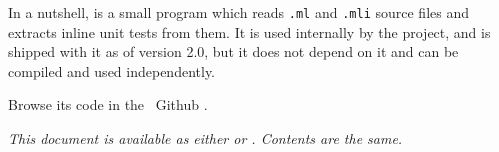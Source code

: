 
In a nutshell, \qtest{} is a small program which reads \texttt{.ml} and \texttt{.mli} source files and
extracts inline \ounit{} unit tests from them. It is used internally by the \OCaml{}
\bat{} project, and is shipped with it as of version 2.0, but it does not depend on
it and can be compiled and used independently.

Browse its code in the \bat\ Github
.

\emph{This document is available as either  or
. Contents are the same.}